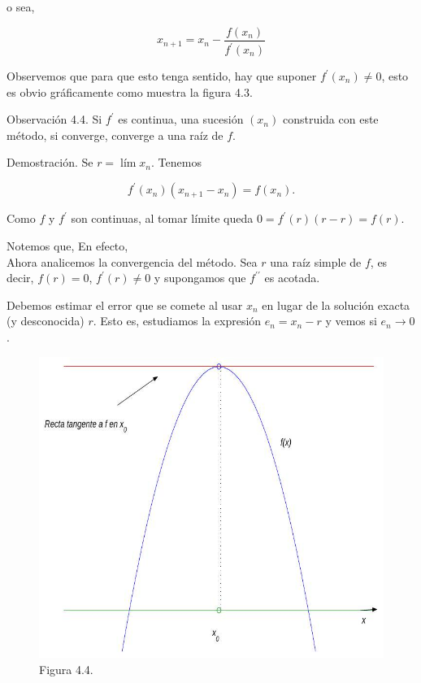 \documentclass[10pt]{book}
\begin{document}
o sea,

$$
x_{n+1}=x_{n}-\frac{f\left(x_{n}\right)}{f^{\prime}\left(x_{n}\right)}
$$

Observemos que para que esto tenga sentido, hay que suponer $f^{\prime}\left(x_{n}\right) \neq 0$, esto es obvio gráficamente como muestra la figura 4.3.

Observación 4.4. Si $f^{\prime}$ es continua, una sucesión $\left(x_{n}\right)$ construida con este método, si converge, converge a una raíz de $f$.

Demostración. Se $r=\operatorname{lím} x_{n}$. Tenemos

$$
f^{\prime}\left(x_{n}\right)\left(x_{n+1}-x_{n}\right)=f\left(x_{n}\right) .
$$

Como $f$ y $f^{\prime}$ son continuas, al tomar límite queda $0=f^{\prime}(r)(r-r)=f(r)$.

Notemos que, En efecto,\\
Ahora analicemos la convergencia del método. Sea $r$ una raíz simple de $f$, es decir, $f(r)=0$, $f^{\prime}(r) \neq 0$ y supongamos que $f^{\prime \prime}$ es acotada.

Debemos estimar el error que se comete al usar $x_{n}$ en lugar de la solución exacta (y desconocida) $r$. Esto es, estudiamos la expresión $e_{n}=x_{n}-r$ y vemos si $e_{n} \rightarrow 0$.

\begin{figure}[h]
\begin{center}
  \includegraphics[width=\textwidth]{2025_09_05_3888c9ac96bd653d96b4g-075}
\captionsetup{labelformat=empty}
\caption{Figura 4.4.}
\end{center}
\end{figure}
\end{document}
